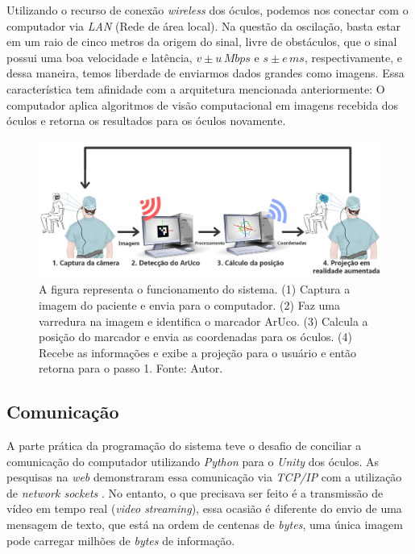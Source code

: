 Utilizando o recurso de conexão \textit{wireless} dos óculos, podemos nos conectar com o computador via \textit{LAN} (Rede de área local). Na questão da oscilação, basta estar em um raio de cinco metros da origem do sinal, livre de obstáculos, que o sinal possui uma boa velocidade e latência, \(v \pm u \, Mbps\) e  \(s \pm e \, ms\), respectivamente, e dessa maneira, temos liberdade de enviarmos dados grandes como imagens. Essa característica tem afinidade com a arquitetura mencionada anteriormente: O computador aplica algoritmos de visão computacional em imagens recebida dos óculos e retorna os resultados para os óculos novamente.

\begin{figure}[ht]
    \centering
    \includegraphics[width=.9\linewidth]{figuras/System schematic.png}
    \caption{A figura representa o funcionamento do sistema. (1) Captura a imagem do paciente e envia para o computador. (2) Faz uma varredura na imagem e identifica o marcador ArUco. (3) Calcula a posição do marcador e envia as coordenadas para os óculos. (4) Recebe as informações e exibe a projeção para o usuário e então retorna para o passo 1. Fonte: Autor.}
    \label{fig:arc}
\end{figure}

\subsection{Comunicação}

A parte prática da programação do sistema teve o desafio de conciliar a comunicação do computador utilizando \textit{Python} para o \textit{Unity} dos óculos. As pesquisas na \textit{web} demonstraram essa comunicação via \textit{TCP/IP} com a utilização de \textit{network sockets} \cite{socket-tutorial}. No entanto, o que precisava ser feito é a transmissão de vídeo em tempo real (\textit{video streaming}), essa ocasião é diferente do envio de uma mensagem de texto, que está na ordem de centenas de \textit{bytes}, uma única imagem pode carregar milhões de \textit{bytes} de informação.

